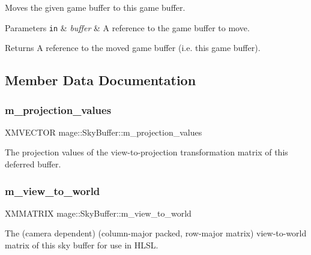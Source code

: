 Moves the given game buffer to this game buffer.


\begin{DoxyParams}[1]{Parameters}
\mbox{\tt in}  & {\em buffer} & A reference to the game buffer to move. \\
\hline
\end{DoxyParams}
\begin{DoxyReturn}{Returns}
A reference to the moved game buffer (i.\+e. this game buffer). 
\end{DoxyReturn}


\subsection{Member Data Documentation}
\hypertarget{structmage_1_1_sky_buffer_a1f5e0bc2381d392771994d0c2fce9ee4}{}\label{structmage_1_1_sky_buffer_a1f5e0bc2381d392771994d0c2fce9ee4} 
\subsubsection{\texorpdfstring{m\+\_\+projection\+\_\+values}{m\_projection\_values}}
{\footnotesize\ttfamily X\+M\+V\+E\+C\+T\+OR mage\+::\+Sky\+Buffer\+::m\+\_\+projection\+\_\+values}

The projection values of the view-\/to-\/projection transformation matrix of this deferred buffer. \hypertarget{structmage_1_1_sky_buffer_ab2c20eb6422420a3e79ff1ef90efd735}{}\label{structmage_1_1_sky_buffer_ab2c20eb6422420a3e79ff1ef90efd735} 
\subsubsection{\texorpdfstring{m\+\_\+view\+\_\+to\+\_\+world}{m\_view\_to\_world}}
{\footnotesize\ttfamily X\+M\+M\+A\+T\+R\+IX mage\+::\+Sky\+Buffer\+::m\+\_\+view\+\_\+to\+\_\+world}

The (camera dependent) (column-\/major packed, row-\/major matrix) view-\/to-\/world matrix of this sky buffer for use in H\+L\+SL. 